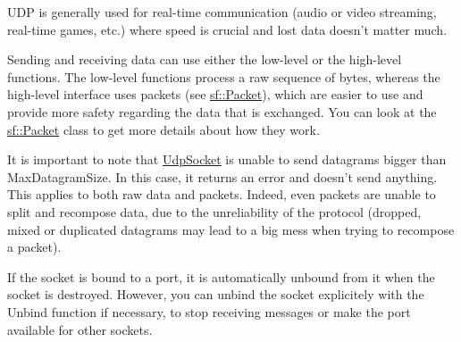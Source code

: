 U\-D\-P is generally used for real-\/time communication (audio or video streaming, real-\/time games, etc.) where speed is crucial and lost data doesn't matter much.

Sending and receiving data can use either the low-\/level or the high-\/level functions. The low-\/level functions process a raw sequence of bytes, whereas the high-\/level interface uses packets (see \hyperlink{classsf_1_1Packet}{sf\-::\-Packet}), which are easier to use and provide more safety regarding the data that is exchanged. You can look at the \hyperlink{classsf_1_1Packet}{sf\-::\-Packet} class to get more details about how they work.

It is important to note that \hyperlink{classsf_1_1UdpSocket}{Udp\-Socket} is unable to send datagrams bigger than Max\-Datagram\-Size. In this case, it returns an error and doesn't send anything. This applies to both raw data and packets. Indeed, even packets are unable to split and recompose data, due to the unreliability of the protocol (dropped, mixed or duplicated datagrams may lead to a big mess when trying to recompose a packet).

If the socket is bound to a port, it is automatically unbound from it when the socket is destroyed. However, you can unbind the socket explicitely with the Unbind function if necessary, to stop receiving messages or make the port available for other sockets.

